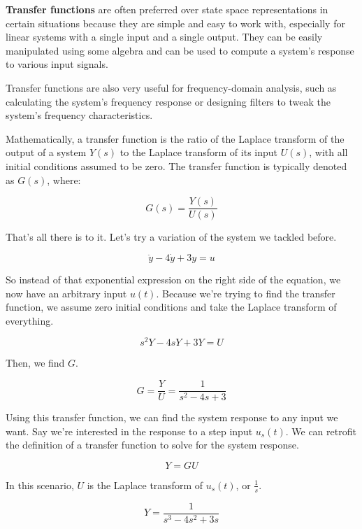 \documentclass{report}
\begin{document}
\begin{onehalfspacing}
\begin{flushleft}
\textbf{Transfer functions} are often preferred over state space representations in certain situations because they are simple and easy to work with, especially for linear systems with a single input and a single output. They can be easily manipulated using some algebra and can be used to compute a system's response to various input signals. 

\medskip

Transfer functions are also very useful for frequency-domain analysis, such as calculating the system's frequency response or designing filters to tweak the system's frequency characteristics. 

\medskip

Mathematically, a transfer function is the ratio of the Laplace transform of the output of a system \(Y(s)\) to the Laplace transform of its input \(U(s)\), with all initial conditions assumed to be zero. The transfer function is typically denoted as \(G(s)\), where:

\vspace{-0.1in}
\[G(s) = \frac{Y(s)}{U(s)}\]

That's all there is to it. Let's try a variation of the system we tackled before.

\vspace{-0.1in}
\[\ddot{y} - 4 \dot{y} + 3y = u\]

So instead of that exponential expression on the right side of the equation, we now have an arbitrary input \(u(t)\). Because we're trying to find the transfer function, we assume zero initial conditions and take the Laplace transform of everything.

\vspace{-0.1in}
\[s^2 Y - 4 s Y + 3Y = U\]

Then, we find \(G\).

\vspace{-0.1in}
\[G = \frac{Y}{U} = \frac{1}{s^2 - 4s + 3}\]

Using this transfer function, we can find the system response to any input we want. Say we're interested in the response to a step input \(u_s(t)\). We can retrofit the definition of a transfer function to solve for the system response.

\vspace{-0.1in}
\[Y = G U\]

In this scenario, \(U\) is the Laplace transform of \(u_s(t)\), or \(\frac{1}{s}\).

\vspace{-0.1in}
\[Y = \frac{1}{s^3 - 4s^2 + 3s}\]


\end{flushleft}
\end{onehalfspacing}
\end{document}
